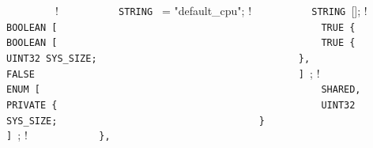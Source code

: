 {%
\lstinline!        !\quad \quad{} {             ! \newline
\lstinline!          STRING ! = "default_cpu";    ! \newline
\lstinline!          STRING ![];             ! \newline
\lstinline!                                                     ! \newline
\lstinline!          BOOLEAN [                                  ! \newline
\lstinline!            TRUE {                                   ! \newline
\lstinline!              BOOLEAN [                              ! \newline
\lstinline!                TRUE {                               ! \newline
\lstinline!                  UINT32 SYS_SIZE;                   ! \newline
\lstinline!                },                                   ! \newline
\lstinline!                FALSE                                ! \newline
\lstinline!              ] !;              ! \newline
\lstinline!              ENUM [                                 ! \newline
\lstinline!                SHARED,                              ! \newline
\lstinline!                PRIVATE {                            ! \newline
\lstinline!                  UINT32 SYS_SIZE;                   ! \newline
\lstinline!                }                                    ! \newline
\lstinline!              ] !;            ! \newline
\lstinline!            },                                       ! \newline
}}
